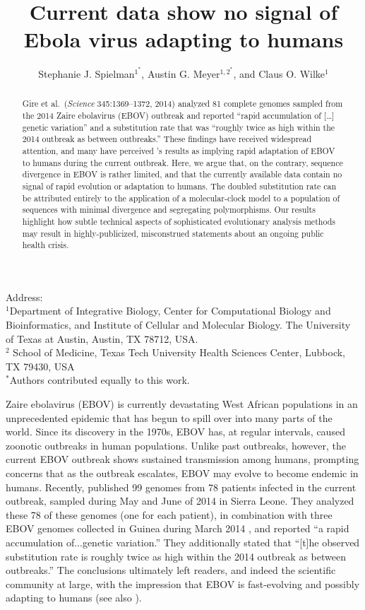 \documentclass[11pt]{article}
\title{Current data show no signal of Ebola virus adapting to humans}
\author{Stephanie J. Spielman$^{1^\ast}$, Austin G. Meyer$^{1,2^\ast}$, and Claus O. Wilke$^{1}$}
\begin{document}
\maketitle
\maketitle
\noindent
Address:\\
$^1$Department of Integrative Biology, Center for Computational Biology and Bioinformatics, and Institute of Cellular and Molecular Biology.
The University of Texas at Austin, Austin, TX 78712, USA.\\
$^2$ School of Medicine, Texas Tech University Health Sciences Center, Lubbock, TX 79430, USA \\
$^\ast$Authors contributed equally to this work.


\begin{abstract}
Gire et al.\ (\emph{Science} 345:1369--1372, 2014) analyzed 81 complete genomes sampled from the 2014 Zaire ebolavirus (EBOV) outbreak and reported ``rapid accumulation of [\dots] genetic variation'' and a substitution rate that was ``roughly twice as high within the 2014 outbreak as between outbreaks.'' These findings have received widespread attention, and many have perceived \citet{Gire2014}'s results as implying rapid adaptation of EBOV to humans during the current outbreak. Here, we argue that, on the contrary, sequence divergence in EBOV is rather limited, and that the currently available data contain no signal of rapid evolution or adaptation to humans. The doubled substitution rate can be attributed entirely to the application of a molecular-clock model to a population of sequences with minimal divergence and segregating polymorphisms. Our results highlight how subtle technical aspects of sophisticated evolutionary analysis methods may result in highly-publicized, misconstrued statements about an ongoing public health crisis.
\end{abstract}

\noindent
Zaire ebolavirus (EBOV) is currently devastating West African populations in an unprecedented epidemic that has begun to spill over into many parts of the world. Since its discovery in the 1970s, EBOV has, at regular intervals, caused zoonotic outbreaks in human populations. Unlike past outbreaks, however, the current EBOV outbreak shows sustained transmission among humans, prompting concerns that as the outbreak escalates, EBOV may evolve to become endemic in humans. Recently, \citet{Gire2014} published 99 genomes from 78 patients infected in the current outbreak, sampled during May and June of 2014 in Sierra Leone. They analyzed these 78 of these genomes (one for each patient), in combination with three EBOV genomes collected in Guinea during March 2014 \citep{Baizeetal2014}, and reported ``a rapid accumulation of...genetic variation.'' They additionally stated that ``[t]he observed substitution rate is roughly twice as high within the 2014 outbreak as between outbreaks.'' The conclusions ultimately left readers, and indeed the scientific community at large, with the impression that EBOV is fast-evolving and possibly adapting to humans (see also \citealt{NatureEditorial,Lukszaetal2014,Alexanderetal2014}). 
\end{document}
